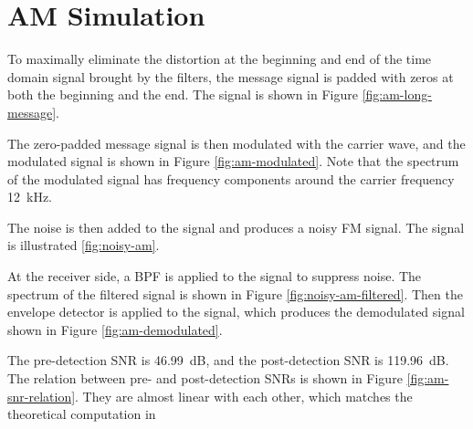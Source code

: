 \documentclass[../ECE459FinalProjectReport.tex]{subfiles}
\begin{document}
\section{AM Simulation}
To maximally eliminate the distortion at the beginning and end of the time domain signal brought by the filters, the message signal is padded with zeros at both the beginning and the end. The signal is shown in Figure \ref{fig:am-long-message}.

The zero-padded message signal is then modulated with the carrier wave, and the modulated signal is shown in Figure \ref{fig:am-modulated}. Note that the spectrum of the modulated signal has frequency components around the carrier frequency \SI{12}{kHz}.

The noise is then added to the signal and produces a noisy FM signal. The signal is illustrated \ref{fig:noisy-am}.

At the receiver side, a BPF is applied to the signal to suppress noise. The spectrum of the filtered signal is shown in Figure \ref{fig:noisy-am-filtered}. Then the envelope detector is applied to the signal, which produces the demodulated signal shown in Figure \ref{fig:am-demodulated}.

The pre-detection SNR is \SI{46.99}{dB}, and the post-detection SNR is \SI{119.96}{dB}. The relation between pre- and post-detection SNRs is shown in Figure \ref{fig:am-snr-relation}. They are almost linear with each other, which matches the theoretical computation in \cite[Sec. 9.7]{haykinIntroductionAnalogDigital2007}
\end{document}

